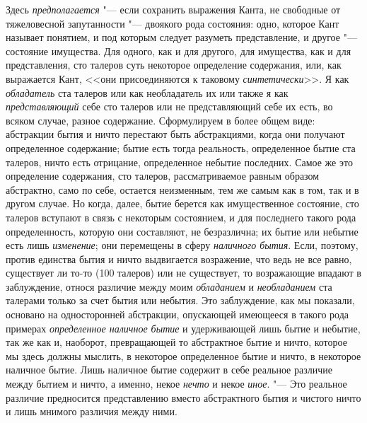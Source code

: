 Здесь {\em предполагается} "--- если сохранить выражения
Канта, не свободные от тяжеловесной запутанности "--- двоякого рода состояния:
одно, которое Кант называет понятием, и под которым следует разуметь
представление, и другое "--- состояние имущества. Для одного, как и для
другого, для имущества, как и для представления, сто талеров суть некоторое
определение содержания, или, как выражается Кант, <<они присоединяются к
таковому {\em синтетически}>>. Я как
{\em обладатель} ста талеров или как необладатель их
или также я как {\em представляющий} себе сто талеров
или не представляющий себе их есть, во всяком случае, разное содержание.
Сформулируем в более общем виде: абстракции бытия и ничто перестают быть
абстракциями, когда они получают определенное содержание; бытие есть тогда
реальность, определенное бытие ста талеров, ничто есть отрицание,
определенное небытие последних. Самое же это определение содержания, сто
талеров, рассматриваемое равным образом абстрактно, само по себе, остается
неизменным, тем же самым как в том, так и в другом случае. Но когда, далее,
бытие берется как имущественное состояние, сто талеров вступают в связь с
некоторым состоянием, и для последнего такого рода определенность, которую
они составляют, не безразлична; их бытие или небытие есть лишь
{\em изменение}; они перемещены в сферу
{\em наличного бытия}. Если, поэтому, против единства
бытия и ничто выдвигается возражение, что ведь не все равно, существует ли
то-то (100 талеров) или не существует, то возражающие впадают в
заблуждение, относя различие между моим
{\em обладанием} и
{\em необладанием} ста талерами только за счет бытия
или небытия. Это заблуждение, как мы показали, основано на односторонней
абстракции, опускающей имеющееся в такого рода примерах
{\em определенное наличное бытие} и удерживающей лишь
бытие и небытие, так же как и, наоборот, превращающей то абстрактное бытие
и ничто, которое мы здесь должны мыслить, в некоторое определенное бытие и
ничто, в некоторое наличное бытие. Лишь наличное бытие содержит в себе
реальное различие между бытием и ничто, а именно, некое
{\em нечто} и некое {\em иное}. "--- Это реальное различие предносится
представлению вместо абстрактного бытия и
чистого ничто и лишь мнимого различия между ними.

